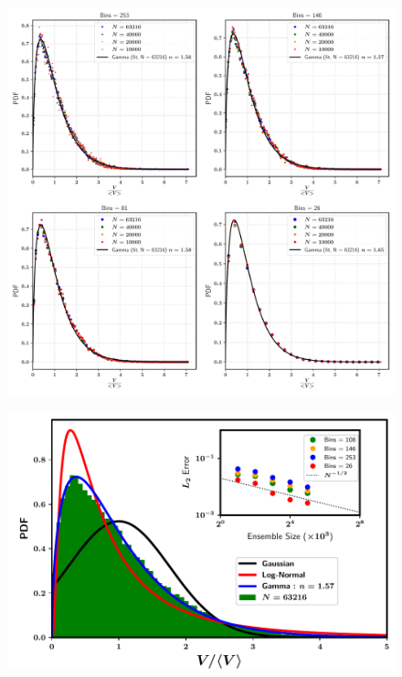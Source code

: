 \begin{figure}
\centering
\includegraphics{plots/drop_stats/long_time_volume_bins.pdf}
	\caption{\blindtext}
\label{t2_vol_bins}
\end{figure}




\begin{figure}
\centering
\includegraphics{plots/drop_stats/long_time_volume_fits.pdf}
	\caption{\blindtext}
\label{t2_vol_fits}
\end{figure}

